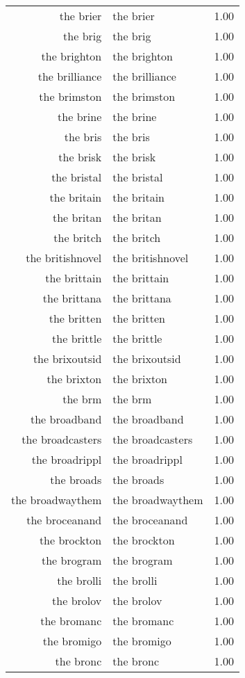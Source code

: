 \begin{table}[ht]
\begin{tabular}{rlr}
  the brier & the brier & 1.00 \\ 
  the brig & the brig & 1.00 \\ 
  the brighton & the brighton & 1.00 \\ 
  the brilliance & the brilliance & 1.00 \\ 
  the brimston & the brimston & 1.00 \\ 
  the brine & the brine & 1.00 \\ 
  the bris & the bris & 1.00 \\ 
  the brisk & the brisk & 1.00 \\ 
  the bristal & the bristal & 1.00 \\ 
  the britain & the britain & 1.00 \\ 
  the britan & the britan & 1.00 \\ 
  the britch & the britch & 1.00 \\ 
  the britishnovel & the britishnovel & 1.00 \\ 
  the brittain & the brittain & 1.00 \\ 
  the brittana & the brittana & 1.00 \\ 
  the britten & the britten & 1.00 \\ 
  the brittle & the brittle & 1.00 \\ 
  the brixoutsid & the brixoutsid & 1.00 \\ 
  the brixton & the brixton & 1.00 \\ 
  the brm & the brm & 1.00 \\ 
  the broadband & the broadband & 1.00 \\ 
  the broadcasters & the broadcasters & 1.00 \\ 
  the broadrippl & the broadrippl & 1.00 \\ 
  the broads & the broads & 1.00 \\ 
  the broadwaythem & the broadwaythem & 1.00 \\ 
  the broceanand & the broceanand & 1.00 \\ 
  the brockton & the brockton & 1.00 \\ 
  the brogram & the brogram & 1.00 \\ 
  the brolli & the brolli & 1.00 \\ 
  the brolov & the brolov & 1.00 \\ 
  the bromanc & the bromanc & 1.00 \\ 
  the bromigo & the bromigo & 1.00 \\ 
  the bronc & the bronc & 1.00 \\ 

\end{tabular}
\end{table}
